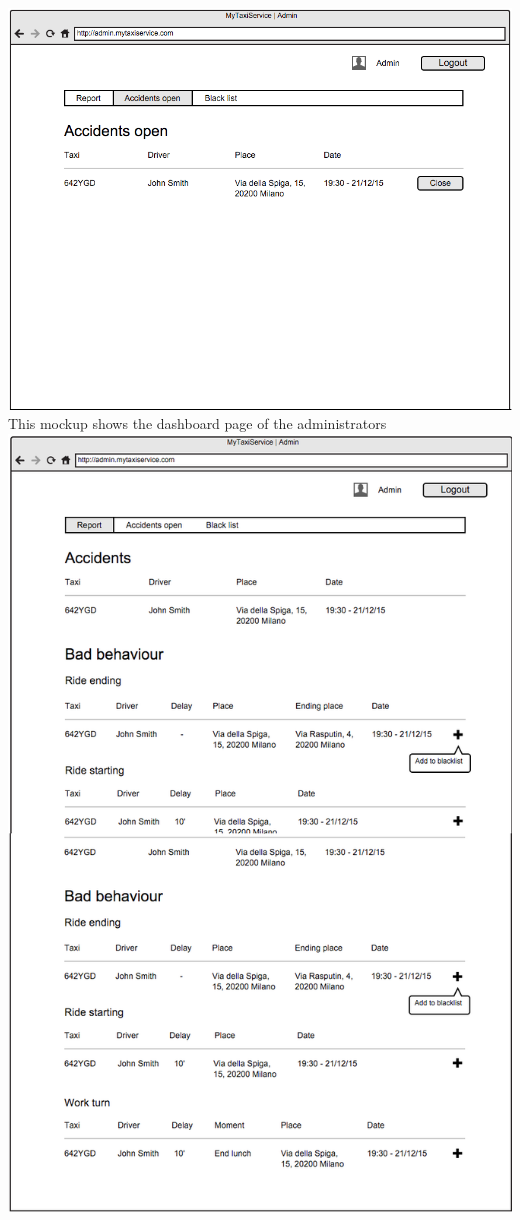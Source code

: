 \documentclass[11pt,titlepage]{article} %
\begin{document}
        \newline
        \includegraphics[scale=0.52]{viewAccidentsOpen.png}\newline
        \newline
        \newpage
        This mockup shows the dashboard page of the administrators\newline
        \newline
        \includegraphics[scale=0.42]{dashboard.png}\newline
\end{document}
